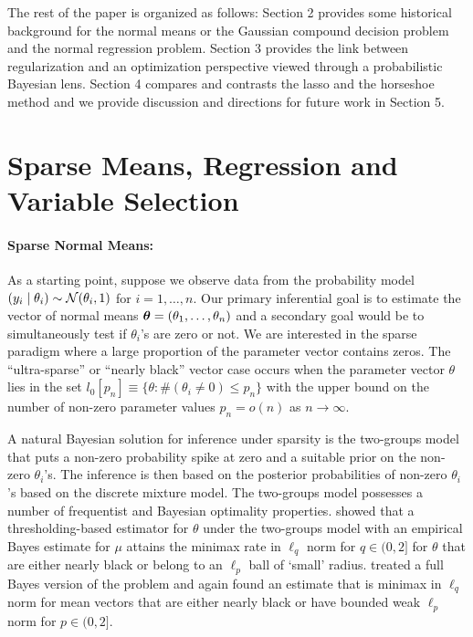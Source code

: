 \documentclass[11pt]{article}
\begin{document}

The rest of the paper is organized as follows: Section 2 provides some historical background for the normal means or the Gaussian compound decision problem and the normal regression problem. Section 3 provides the link between regularization and an optimization perspective viewed through a probabilistic Bayesian lens. Section 4 compares and contrasts the lasso and the horseshoe method and we provide discussion and directions for future work in Section 5. 

\section{Sparse Means, Regression and Variable Selection}

\paragraph{Sparse Normal Means:} As a starting point, suppose we observe data
from the probability model $  (y_i \mid \theta_i)  \sim {\cal N} (\theta_i,1)$ for
$i = 1, \ldots, n$. Our primary inferential goal is to estimate the vector of
normal means $ \boldsymbol{\theta} = ( \theta_1, \ldots , \theta_n )$ and a secondary goal
would be to simultaneously test if $\theta_i$'s are zero or not. We are
interested in the sparse paradigm where a large proportion of the parameter
vector contains zeros.  The ``ultra-sparse'' or ``nearly black'' vector case
occurs when the parameter vector $\theta$ lies in the set $ l_0 [ p_n] \equiv
\{ \theta : \# ( \theta_i \neq 0 ) \leq p_n \} $ with the upper bound on the
number of non-zero parameter values $ p_n = o(n) $ as $ n \to \infty$. 

A natural Bayesian solution for inference under sparsity is the two-groups
model that puts a non-zero probability spike at zero and a suitable prior on
the non-zero $\theta_i$'s. The inference is then based on the posterior
probabilities of non-zero $\theta_i$'s based on the discrete mixture model. The
two-groups model possesses a number of frequentist and Bayesian optimality
properties. \cite{johnstone2004needles} showed that a thresholding-based
estimator for $\theta$ under the two-groups model with an empirical Bayes
estimate for $\mu$ attains the minimax rate in $\ell_q$ norm for $q \in (0,2]$
for $\theta$ that are either nearly black or belong to an $\ell_p$ ball of
`small' radius. \cite{castillo2012needles} treated a full Bayes version of the
problem and again found an estimate that is minimax in $\ell_q$ norm for mean
vectors that are either nearly black or have bounded weak $\ell_p$ norm for $p
\in (0,2]$. 
\end{document}
